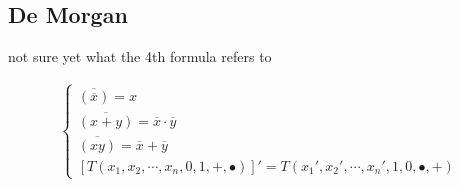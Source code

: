 \documentclass[a4paper,12pt]{article}
\begin{document}
\subsection{De Morgan}
\label{sec:org6ad57b0}
\begin{lemma}
\begin{note}
not sure yet what the 4th formula refers to\\
\end{note}
\begin{gather*}
  \begin{cases}
    \overline{(\overline{x})} = x\\
    \overline{(x + y)} = \overline{x} \cdot \overline{y}\\
    \overline{(xy)} = \overline{x} + \overline{y}\\
    [T(x_1, x_2, \cdots, x_n, 0, 1, +, \bullet)]' = T(x_1', x_2', \cdots, x_n', 1, 0, \bullet, +)
  \end{cases}
\end{gather*}
\end{lemma}
\end{document}
